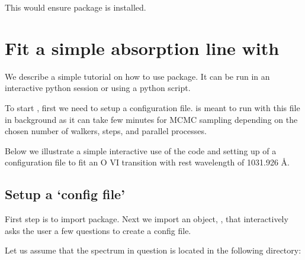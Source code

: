 \documentclass[a4paper,11pt,english]{sphinxmanual}
\begin{document}
This would ensure  package is installed.


\section{Fit a simple absorption line with }
\label{\detokenize{tutorial:fit-a-simple-absorption-line-with-bayesvp}}
We describe a simple tutorial on how to use  package. It can
be run in an interactive python session or using a python script.

To start , first we need to setup a configuration file.
 is meant to run with this file in background as it can take
few minutes for MCMC sampling depending on the chosen number of walkers,
steps, and parallel processes.

Below we illustrate a simple interactive use of the code and setting up
of a configuration file to fit an O VI transition with rest wavelength
of 1031.926 Å.


\subsection{Setup a ‘config file’}
\label{\detokenize{tutorial:setup-a-config-file}}
First step is to import  package. Next we import an object,
, that interactively asks the user a few questions
to create a config file.

%
\begin{sphinxVerbatim}[commandchars=\\\{\}]
 \PYG{p}{[}\PYG{p}{]}  

 \PYG{p}{[}\PYG{p}{]}      
\end{sphinxVerbatim}

Let us assume that the spectrum in question is located in the following
directory:

%
\begin{sphinxVerbatim}[commandchars=\\\{\}]
 \PYG{p}{[}\PYG{p}{]}   
\end{sphinxVerbatim}
\end{document}
